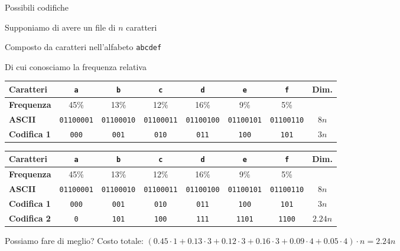 \begin{frame}{Possibili codifiche}

\vspace{-9pt}
\begin{myboxtitle}[Esempio]
\BI
\item Supponiamo di avere un file di $n$ caratteri
\item Composto da caratteri nell'alfabeto \texttt{abcdef}
\item Di cui conosciamo la frequenza relativa
\EI
\end{myboxtitle}

\bigskip
\begin{overprint}
\begin{tabular}{|l|c|c|c|c|c|c|c|}
\hline
\textbf{Caratteri} & \texttt{a} & \texttt{b} & \texttt{c} & \texttt{d} & \texttt{e} & \texttt{f} & \textbf{Dim.} \\\hline
\textbf{Frequenza} & 45\% & 13\% & 12\% & 16\% & 9\% & 5\% & \\ \hline
\textbf{ASCII} & \texttt{\tiny 01100001} & \texttt{\tiny 01100010} & \texttt{\tiny 01100011} & \texttt{\tiny 01100100} & \texttt{\tiny 01100101} & \texttt{\tiny 01100110} & $8n$ \\\hline
\textbf{Codifica 1} & \texttt{\small 000} & \texttt{\small 001} & \texttt{\small 010} & \texttt{\small 011} & \texttt{\small 100} & \texttt{\small 101} & $3n$ \\\hline
\end{tabular}
\begin{tabular}{|l|c|c|c|c|c|c|c|}
\hline
\textbf{Caratteri} & \texttt{a} & \texttt{b} & \texttt{c} & \texttt{d} & \texttt{e} & \texttt{f} & \textbf{Dim.} \\\hline
\textbf{Frequenza} & 45\% & 13\% & 12\% & 16\% & 9\% & 5\% & \\ \hline
\textbf{ASCII} & \texttt{\tiny 01100001} & \texttt{\tiny 01100010} & \texttt{\tiny 01100011} & \texttt{\tiny 01100100} & \texttt{\tiny 01100101} & \texttt{\tiny 01100110} & $8n$ \\\hline
\textbf{Codifica 1} & \texttt{\small 000} & \texttt{\small 001} & \texttt{\small 010} & \texttt{\small 011} & \texttt{\small 100} & \texttt{\small 101} & $3n$ \\\hline
\textbf{Codifica 2} & \texttt{\small 0} & \texttt{\small 101} & \texttt{\small 100} & \texttt{\small 111} & \texttt{\small 1101} & \texttt{\small 1100} & $2.24n$ \\\hline
\end{tabular}
\end{overprint}
\bigskip
\begin{overprint}
\alert{Possiamo fare di meglio?}
\alert{Costo totale}: $(0.45 \cdot 1+0.13 \cdot 3+0.12 \cdot 3+0.16 \cdot 3+0.09 \cdot 4+0.05 \cdot 4) \cdot n=2.24n$
\end{overprint}
\end{frame}

